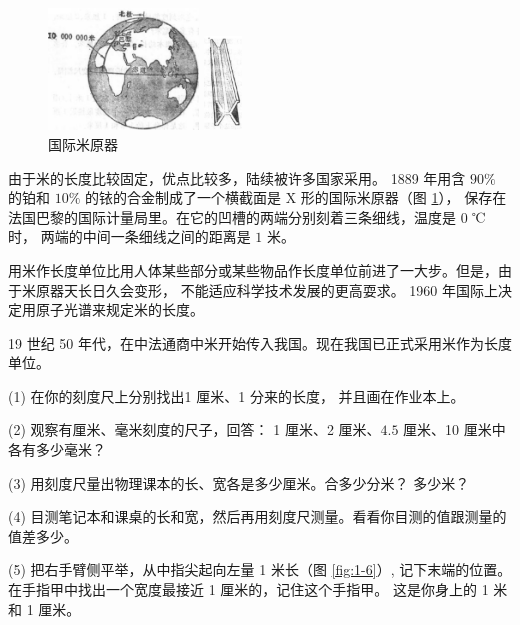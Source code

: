 \begin{figure}[htbp]
    \centering
    \begin{minipage}{7cm}
    \centering
    \includegraphics[width=4cm]{../pic/czwl1-ch1-4}
    \caption{}\label{fig:1-4}
    \end{minipage}
    \qquad
    \begin{minipage}{6cm}
    \centering
    \includegraphics[width=1cm]{../pic/czwl1-ch1-5}
    \caption{国际米原器}\label{fig:1-5}
    \end{minipage}
\end{figure}


由于米的长度比较固定，优点比较多，陆续被许多国家采用。
1889 年用含 $90\%$ 的铂和 $10\%$ 的铱的合金制成了一个横截面是 X 形的国际米原器（图 \ref{fig:1-5}），
保存在法国巴黎的国际计量局里。在它的凹槽的两端分别刻着三条细线，温度是 0 ℃ 时，
两端的中间一条细线之间的距离是 $1$ 米。


用米作长度单位比用人体某些部分或某些物品作长度单位前进了一大步。但是，由于米原器天长日久会变形，
不能适应科学技术发展的更高耍求。 1960 年国际上决定用原子光谱来规定米的长度。

19 世纪 50 年代，在中法通商中米开始传入我国。现在我国已正式采用米作为长度单位。


\lianxi

(1) 在你的刻度尺上分别找出1 厘米、1 分来的长度， 并且画在作业本上。

(2) 观察有厘米、毫米刻度的尺子，回答： 1 厘米、2 厘米、$4.5$ 厘米、10 厘米中各有多少毫米？

(3) 用刻度尺量出物理课本的长、宽各是多少厘米。合多少分米？ 多少米？

(4) 目测笔记本和课桌的长和宽，然后再用刻度尺测量。看看你目测的值跟测量的值差多少。

(5) 把右手臂侧平举，从中指尖起向左量 1 米长（图 \ref{fig:1-6}）, 记下末端的位置。
在手指甲中找出一个宽度最接近 1 厘米的，记住这个手指甲。
这是你身上的 1 米和 1 厘米。

